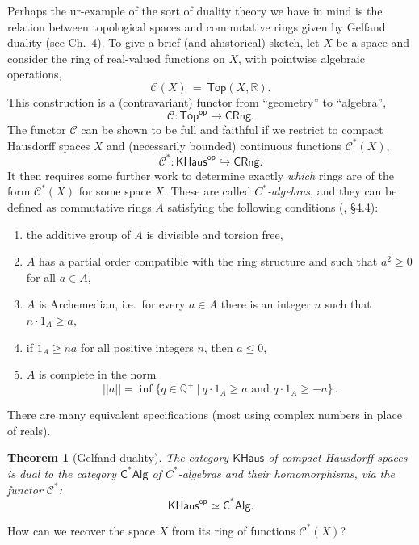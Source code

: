 \documentclass[12pt]{article}
\newtheorem*{theorem*}{Theorem}
\theoremstyle{remark}
\theoremstyle{definition}
\begin{document}
Perhaps the ur-example of the sort of duality theory we have in mind is the relation between topological spaces and commutative rings given by Gelfand duality (see \cite{J} Ch.~4).  To give a brief (and ahistorical) sketch, let $X$ be a  space and consider the ring of real-valued functions on $X$, with pointwise algebraic operations,
\[
 \mathcal{C}(X)\ =\ \mathsf{Top}(X, \mathbb{R}).
 \]
 This construction is a (contravariant) functor from ``geometry'' to ``algebra'',
 \[
 \mathcal{C} : \mathsf{Top}^\mathsf{op} \to \mathsf{CRng}.
 \]
%
The functor $ \mathcal{C}$ can be shown  to be full and faithful if we restrict to compact Hausdorff spaces $X$ and (necessarily bounded) continuous functions  $\mathcal{C}^*(X)$,
 \[
 \mathcal{C}^* : \mathsf{KHaus}^\mathsf{op} \hookrightarrow \mathsf{CRng}.
 \]
It then requires some further work to determine exactly \emph{which} rings are of the form $\mathcal{C}^*(X)$ for some space $X$.   These are called \emph{$C^*$-algebras}, and they can be defined as commutative rings $A$ satisfying the following conditions (\cite{J}, \S4.4):
\begin{enumerate}
\item the additive group of $A$ is divisible and torsion free,
\item $A$ has a partial order compatible with the ring structure and such that $a^2 \geq 0$ for all $a\in A$,
\item $A$ is Archemedian, i.e.\ for every  $a\in A$ there is an integer $n$ such that $n\cdot 1_A \geq a$,
\item if $1_A\geq na$ for all positive integers $n$, then $a\leq 0$,
\item $A$ is complete in the norm $$||a|| = \inf\{ q\in \mathbb{Q}^+\ |\ q\cdot 1_A \geq a\text{ and } q\cdot 1_A \geq -a\}\,.$$
\end{enumerate}
There are many equivalent specifications (most using complex numbers in place of reals).

 \begin{theorem*}[Gelfand duality]
 The category $\mathsf{KHaus}$ of compact Hausdorff spaces is dual to the category $\mathsf{C^*Alg}$ of $C^*$-algebras and their homomorphisms, via the functor $\mathcal{C}^*$:
 \[
 \mathsf{KHaus}^\mathsf{op} \simeq \mathsf{C^*Alg}.
 \]
 \end{theorem*}

How can we  recover the space $X$ from its ring of functions $\mathcal{C}^*(X)$?
\end{document}
